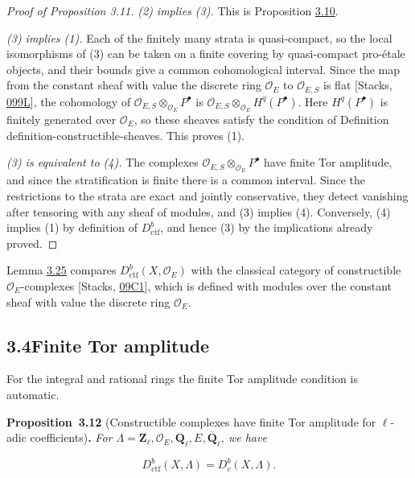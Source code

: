 \documentclass[11pt]{article}
\newenvironment{bpstatement}[2]{\par\addvspace{0.6\baselineskip}\noindent\textbf{#1}#2\textbf{.}\enspace\ignorespaces}
  {\par\addvspace{0.4\baselineskip}}
\newenvironment{bpstatementit}[2]{\begin{bpstatement}{#1}{#2}\itshape\ignorespaces}{\end{bpstatement}}
\providecommand{\Dbc}{}\renewcommand{\Dbc}{D^b_c}
\begin{document}
\begin{proof}[{Proof of Proposition 3.11}]
\emph{(2) implies (3).} This is Proposition \hyperref[bp223]{3.10}.

\emph{(3) implies (1).} Each of the finitely many strata is quasi-compact, so the local isomorphisms of (3) can be taken on a finite covering by quasi-compact pro-étale objects, and their bounds give a common cohomological interval. Since the map from the constant sheaf with value the discrete ring \(\mathcal O_E\) to \(\mathcal O_{E,S}\) is flat [Stacks, \href{https://stacks.math.columbia.edu/tag/099L}{099L}], the cohomology of \(\mathcal O_{E,S}\otimes_{\mathcal O_E}P^\bullet\) is \(\mathcal O_{E,S}\otimes_{\mathcal O_E}H^q(P^\bullet)\). Here \(H^q(P^\bullet)\) is finitely generated over \(\mathcal O_E\), so these sheaves satisfy the condition of Definition definition-constructible-sheaves. This proves (1).

\emph{(3) is equivalent to (4).} The complexes \(\mathcal O_{E,S}\otimes_{\mathcal O_E}P^\bullet\) have finite Tor amplitude, and since the stratification is finite there is a common interval. Since the restrictions to the strata are exact and jointly conservative, they detect vanishing after tensoring with any sheaf of modules, and (3) implies (4). Conversely, (4) implies (1) by definition of \(D^b_{\mathrm{ctf}}\), and hence (3) by the implications already proved.
\end{proof}

\label{bp229}%
Lemma \hyperref[bp274]{3.25} compares \(D^b_{\mathrm{ctf}}(X,\mathcal O_E)\) with the classical category of constructible \(\mathcal O_E\)-complexes [Stacks, \href{https://stacks.math.columbia.edu/tag/09C1}{09C1}], which is defined with modules over the constant sheaf with value the discrete ring \(\mathcal O_E\).


\subsection*{\texorpdfstring{3.4\quad Finite Tor amplitude}{3.4 Finite Tor amplitude}}
\label{bp230}%
\label{bp231}%
For the integral and rational rings the finite Tor amplitude condition is automatic.

\label{bp232}%
\begin{bpstatementit}{Proposition~3.12}{ (Constructible complexes have finite Tor amplitude for $\ell$-adic coefficients)}
For \(\Lambda=\mathbf Z_\ell,\mathcal O_E,\mathbf Q_\ell,E,\overline{\mathbf Q}_\ell\), we have

\[
D^b_{\mathrm{ctf}}(X,\Lambda)=\Dbc(X,\Lambda).
\]
\end{bpstatementit}
\end{document}
